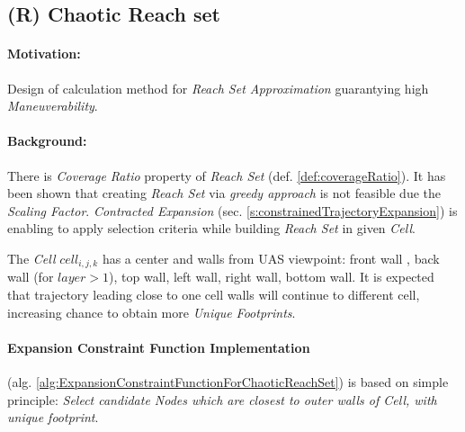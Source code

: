 \subsection{(R) Chaotic Reach set}\label{s:chaoticReachSet}

\paragraph{Motivation:} Design of calculation method for \emph{Reach Set Approximation} guarantying high \emph{Maneuverability}.

\paragraph{Background:}There is \emph{Coverage Ratio} property of \emph{Reach Set} (def. \ref{def:coverageRatio}). It has been shown that creating \emph{Reach Set} via \emph{greedy approach} is not feasible due the \emph{Scaling Factor}.  \emph{Contracted Expansion} (sec. \ref{s:constrainedTrajectoryExpansion}) is enabling to apply selection criteria while building \emph{Reach Set} in given \emph{Cell}. 

The \emph{Cell} $cell_{i,j,k}$ has a center and walls from UAS viewpoint: front wall , back wall (for $layer > 1$), top wall, left wall, right wall, bottom wall. It is expected that trajectory leading close to one cell walls will continue to different cell, increasing chance to obtain more \emph{Unique Footprints}. 

\paragraph{Expansion Constraint Function Implementation} (alg. \ref{alg:ExpansionConstraintFunctionForChaoticReachSet}) is based on simple principle: \emph{Select candidate Nodes which are  closest to outer walls of Cell, with unique footprint}.

